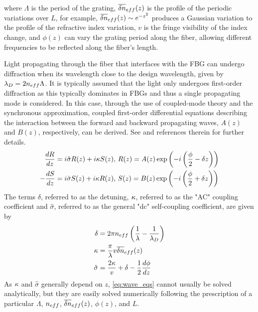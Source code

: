 %
where $\Lambda$ is the period of the grating, $\overline{\delta n}_{eff}(z)$ is the profile of the periodic variations over $L$, for example, $\overline{\delta n}_{eff}(z) \sim e^{-z^2}$ produces a Gaussian variation to the profile of the refractive index variation, 
$v$ is the fringe visibility of the index change, and $\phi(z)$ can vary the grating period along the fiber, allowing different frequencies to be reflected along the fiber's length.
%
\par
%
Light propagating through the fiber that interfaces with the FBG can undergo diffraction when its wavelength close to the design wavelength, given by $\lambda_D = 2 n_{eff} \Lambda$. 
It is typically assumed that the light only undergoes first-order diffraction as this typically dominates in FBGs and thus a single propagating mode is considered. 
In this case, through the use of coupled-mode theory and the synchronous approximation, 
coupled first-order differential equations describing the interaction between the forward and backward propagating waves, $A(z)$ and $B(z)$, respectively, can be derived. 
See \cite{erdogan1997fiber} and references therein for further details.
%
\begin{equation}
\label{eq:wave_eqs}
    \begin{aligned}
        \frac{dR}{dz} &= i \hat{\sigma} R(z) + i \kappa S(z), \, R(z) = A(z) \exp{ \left( -i \left( \frac{\phi}{2} -\delta z \right) \right) }\\
        -\frac{dS}{dz} &= i \hat{\sigma} S(z) + i \kappa R(z), \, S(z) = B(z) \exp{ \left( -i \left( \frac{\phi}{2} + \delta z \right) \right) }
    \end{aligned}
\end{equation}
%
The terms $\delta$, referred to as the detuning, $\kappa$, referred to as the "AC" coupling coefficient and $\hat{\sigma}$, referred to as the general "dc" self-coupling coefficient, are given by
%
\begin{align}
    \label{eq:delta}
    \delta &= 2 \pi n_{eff} \left( \frac{1}{\lambda} - \frac{1}{\lambda_D} \right) \\
    \label{eq:kappa}
    \kappa &= \frac{\pi}{\lambda} v \overline{\delta n}_{eff}(z)\\
    \label{eq:sigma}
    \hat{\sigma} &= \frac{2\kappa}{v} + \delta -\frac{1}{2}\frac{d\phi}{dz}
\end{align}
%
As $\kappa$ and $\hat{\sigma}$ generally depend on $z$, \eqref{eq:wave_eqs} cannot usually be solved analytically, but they are easily solved numerically following the prescription of a particular $\Lambda$, $n_{eff}$, $\overline{\delta n}_{eff}(z)$, $\phi(z)$, and $L$. 
